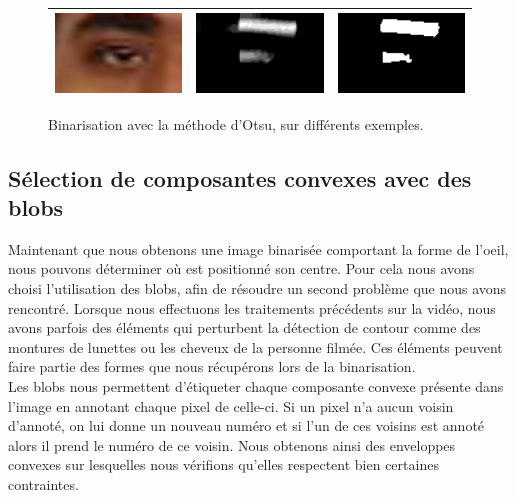 \begin{figure}[H]
\begin{tabular}{|c|c|c|}
    \hline
    \includegraphics[width=4cm]{image/ssm3/rgb_source.png} & \includegraphics[width=4cm]{image/ssm3/ycbcr_inv_open.png} & \includegraphics[width=4cm]{image/ssm3/ycbcr_bin_open.png} \\
    \hline
  \end{tabular}
  \caption{Binarisation avec la méthode d'Otsu, sur différents exemples.}
\end{figure}

\subsection{Sélection de composantes convexes avec des blobs}
Maintenant que nous obtenons une image binarisée comportant la forme de l'oeil, nous pouvons déterminer où est
positionné son centre. Pour cela nous avons choisi l'utilisation des blobs, afin de résoudre un second 
problème que nous avons rencontré. Lorsque nous effectuons les traitements précédents sur la vidéo, nous avons
parfois des éléments qui perturbent la détection de contour comme des montures de lunettes ou les cheveux de la personne 
filmée. Ces éléments peuvent faire partie des formes que nous récupérons lors de la binarisation.\\ 

Les blobs nous permettent d'étiqueter chaque composante convexe présente dans l'image en annotant
chaque pixel de celle-ci. Si un pixel n'a aucun voisin d'annoté, on lui donne un nouveau numéro et si
l'un de ces voisins est annoté alors il prend le numéro de ce voisin. Nous obtenons ainsi des enveloppes
convexes sur lesquelles nous vérifions qu'elles respectent bien certaines contraintes.\\

